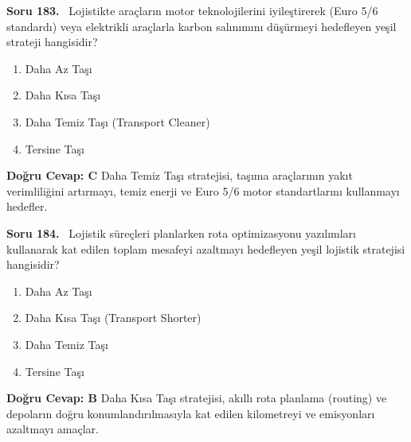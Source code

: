 \documentclass[11pt,a4paper,openany]{book}
\begin{document}
\needspace{5cm}
\vspace{8pt}
\noindent\textbf{\large\sffamily Soru 183.} \ Lojistikte araçların motor teknolojilerini iyileştirerek (Euro 5/6 standardı) veya elektrikli araçlarla karbon salınımını düşürmeyi hedefleyen yeşil strateji hangisidir?
\begin{enumerate}[label=\Alph*), leftmargin=25pt, topsep=4pt, itemsep=2pt]
    \item Daha Az Taşı
    \item Daha Kısa Taşı
    \item Daha Temiz Taşı (Transport Cleaner)
    \item Tersine Taşı
\end{enumerate}
\vspace{4pt}
\begin{tcolorbox}[title=Cevap ve Açıklama, colback=gray!3!white, colframe=primarycolor!90!black, arc=2mm, fonttitle=\bfseries\sffamily, top=6pt, bottom=6pt]
    \textbf{Doğru Cevap: C}
    \vspace{2pt}
    Daha Temiz Taşı stratejisi, taşıma araçlarının yakıt verimliliğini artırmayı, temiz enerji ve Euro 5/6 motor standartlarını kullanmayı hedefler.
\end{tcolorbox}
\vspace{10pt}

\needspace{5cm}
\vspace{8pt}
\noindent\textbf{\large\sffamily Soru 184.} \ Lojistik süreçleri planlarken rota optimizasyonu yazılımları kullanarak kat edilen toplam mesafeyi azaltmayı hedefleyen yeşil lojistik stratejisi hangisidir?
\begin{enumerate}[label=\Alph*), leftmargin=25pt, topsep=4pt, itemsep=2pt]
    \item Daha Az Taşı
    \item Daha Kısa Taşı (Transport Shorter)
    \item Daha Temiz Taşı
    \item Tersine Taşı
\end{enumerate}
\vspace{4pt}
\begin{tcolorbox}[title=Cevap ve Açıklama, colback=gray!3!white, colframe=primarycolor!90!black, arc=2mm, fonttitle=\bfseries\sffamily, top=6pt, bottom=6pt]
    \textbf{Doğru Cevap: B}
    \vspace{2pt}
    Daha Kısa Taşı stratejisi, akıllı rota planlama (routing) ve depoların doğru konumlandırılmasıyla kat edilen kilometreyi ve emisyonları azaltmayı amaçlar.
\end{tcolorbox}
\vspace{10pt}
\end{document}
